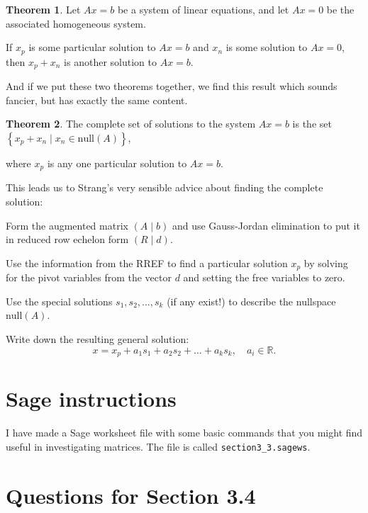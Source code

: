 \documentclass[11pt]{amsart}
\theoremstyle{definition}
\newtheorem*{theorem}{Theorem}
\begin{document}
\begin{theorem}
Let $Ax=b$ be a system of linear equations, and let $Ax=0$ be the associated homogeneous system.

If $x_p$ is some particular solution to $Ax=b$ and $x_n$ is some solution to $Ax=0$, then $x_p + x_n$ is another solution to $Ax=b$.
\end{theorem}

And if we put these two theorems together, we find this result which sounds fancier, but has exactly the same content.
\begin{theorem}
The complete set of solutions to the system $Ax=b$ is the set $\left\{ x_p + x_n \mid x_n \in \mathrm{null}(A) \right\}$,

where $x_p$ is any one particular solution to $Ax=b$.
\end{theorem}


This leads us to Strang's very sensible advice about finding the complete solution:
\begin{compactitem}
\item Form the augmented matrix $\left( A \mid b \right)$ and use Gauss-Jordan elimination to put it in reduced row echelon form $\left( R \mid d \right)$.

\item Use the information from the RREF to find a particular solution $x_p$ by solving for the pivot variables from the vector $d$ and setting the free variables to zero.

\item Use the special solutions $s_1, s_2, \dots, s_k$ (if any exist!) to describe the nullspace $\mathrm{null}(A)$.

\item Write down the resulting general solution:
\[
x = x_p + a_1 s_1 + a_2 s_2 + \dots + a_k s_k, \quad a_i \in \mathbb{R}.
\]
\end{compactitem}

\section{Sage instructions}

I have made a Sage worksheet file with some basic commands that you might find useful in investigating matrices. The file is called \texttt{section3\_3.sagews}.


\section{Questions for Section 3.4}
\setcounter{exercise}{95}
\end{document}
